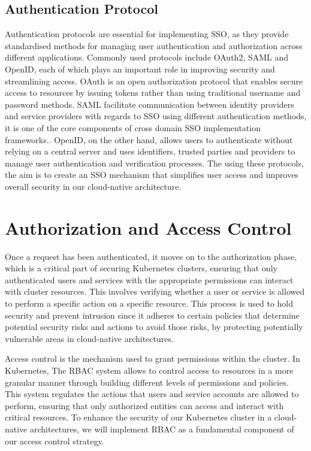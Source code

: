 \subsection{Authentication Protocol}

Authentication protocols are essential for implementing SSO, as they provide standardised methods for managing user authentication and authorization across different applications. Commonly used protocols include OAuth2, SAML and OpenID, each of which plays an important role in improving security and streamlining access. OAuth is an open authorization protocol that enables secure access to resources by issuing tokens rather than using traditional username and password methods. SAML facilitate communication between identity providers and service providers with regards to SSO using different authentication methods, it is one of the core components of cross domain SSO implementation frameworks.. OpenID, on the other hand, allows users to authenticate without relying on a central server and uses identifiers, trusted parties and providers to manage user authentication and verification processes. The using these protocols, the aim is to create an SSO mechanism that simplifies user access and improves overall security in our cloud-native architecture. \cite{waluyo2022comparative}

\section{Authorization and Access Control}

Once a request has been authenticated, it moves on to the authorization phase, which is a critical part of securing Kubernetes clusters, ensuring that only authenticated users and services with the appropriate permissions can interact with cluster resources. This involves verifying whether a user or service is allowed to perform a specific action on a specific resource. This process is used to hold security and prevent intrusion since it adheres to certain policies that determine potential security risks and actions to avoid those risks, by protecting potentially vulnerable areas in cloud-native architectures. \cite{zahoor2023formal}

Access control is the mechanism used to grant permissions within the cluster. In Kubernetes, The RBAC system allows to control access to resources in a more granular manner through building different levels of permissions and policies. This system regulates the actions that users and service accounts are allowed to perform, ensuring that only authorized entities can access and interact with critical resources. To enhance the security of our Kubernetes cluster in a cloud-native architectures, we will implement RBAC as a fundamental component of our access control strategy. \cite{mustyala2021advanced}

